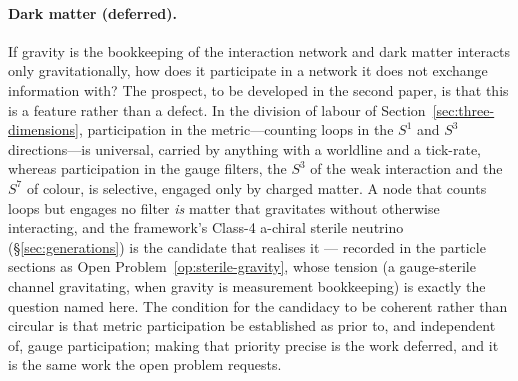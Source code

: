 \paragraph{Dark matter (deferred).}
If gravity is the bookkeeping of the interaction network and dark matter
interacts only gravitationally, how does it participate in a network it does not
exchange information with? The prospect, to be developed in the second paper, is
that this is a feature rather than a defect. In the division of labour of
Section~\ref{sec:three-dimensions}, participation in the metric---counting loops
in the $S^{1}$ and $S^{3}$ directions---is universal, carried by anything with a
worldline and a tick-rate, whereas participation in the gauge filters, the
$S^{3}$ of the weak interaction and the $S^{7}$ of colour, is selective, engaged
only by charged matter. A node that counts loops but engages no filter
\emph{is} matter that gravitates without otherwise interacting, and the
framework's Class-4 a-chiral sterile neutrino (\S\ref{sec:generations}) is the candidate that
realises it --- recorded in the particle sections as Open Problem~\ref{op:sterile-gravity}, whose
tension (a gauge-sterile channel gravitating, when gravity is measurement bookkeeping) is exactly
the question named here. The condition for the candidacy to be coherent rather than circular is
that metric participation be established as prior to, and independent of, gauge participation;
making that priority precise is the work deferred, and it is the same work the open problem
requests.


